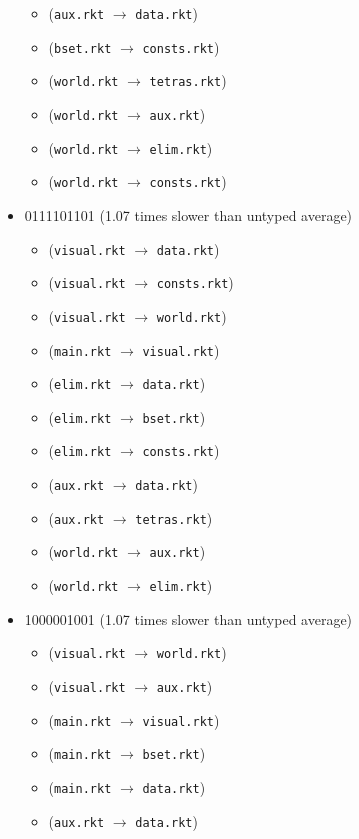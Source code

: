 \documentclass{article}
\newcommand{\mono}[1]{\texttt{#1}}
\begin{document}
\begin{itemize}
\begin{itemize}
  \item (\mono{aux.rkt} $\rightarrow$ \mono{data.rkt})
  \item (\mono{bset.rkt} $\rightarrow$ \mono{consts.rkt})
  \item (\mono{world.rkt} $\rightarrow$ \mono{tetras.rkt})
  \item (\mono{world.rkt} $\rightarrow$ \mono{aux.rkt})
  \item (\mono{world.rkt} $\rightarrow$ \mono{elim.rkt})
  \item (\mono{world.rkt} $\rightarrow$ \mono{consts.rkt})
  \end{itemize}
\item 0111101101 (1.07 times slower than untyped average)
  \begin{itemize}
  \item (\mono{visual.rkt} $\rightarrow$ \mono{data.rkt})
  \item (\mono{visual.rkt} $\rightarrow$ \mono{consts.rkt})
  \item (\mono{visual.rkt} $\rightarrow$ \mono{world.rkt})
  \item (\mono{main.rkt} $\rightarrow$ \mono{visual.rkt})
  \item (\mono{elim.rkt} $\rightarrow$ \mono{data.rkt})
  \item (\mono{elim.rkt} $\rightarrow$ \mono{bset.rkt})
  \item (\mono{elim.rkt} $\rightarrow$ \mono{consts.rkt})
  \item (\mono{aux.rkt} $\rightarrow$ \mono{data.rkt})
  \item (\mono{aux.rkt} $\rightarrow$ \mono{tetras.rkt})
  \item (\mono{world.rkt} $\rightarrow$ \mono{aux.rkt})
  \item (\mono{world.rkt} $\rightarrow$ \mono{elim.rkt})
  \end{itemize}
\item 1000001001 (1.07 times slower than untyped average)
  \begin{itemize}
  \item (\mono{visual.rkt} $\rightarrow$ \mono{world.rkt})
  \item (\mono{visual.rkt} $\rightarrow$ \mono{aux.rkt})
  \item (\mono{main.rkt} $\rightarrow$ \mono{visual.rkt})
  \item (\mono{main.rkt} $\rightarrow$ \mono{bset.rkt})
  \item (\mono{main.rkt} $\rightarrow$ \mono{data.rkt})
  \item (\mono{aux.rkt} $\rightarrow$ \mono{data.rkt})

\end{itemize}
\end{itemize}
\end{document}
